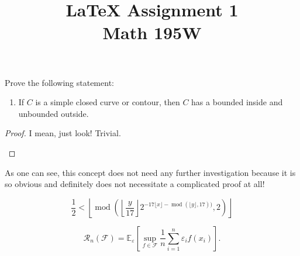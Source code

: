 \documentclass{eeleyes}
\author{\theauthor}
\title{\LaTeX \; Assignment 1 \\ \large Math 195W}
\begin{document}
\maketitle

\begin{theorem}
    Prove the following statement:
    \begin{enumerate}
        \item[]
        If $C$ is a simple closed curve or contour, then $C$ has a bounded inside and unbounded outside.
    \end{enumerate}
\end{theorem}

\begin{proof}
    I mean, just look! Trivial.
    \begin{figure}[h]
        \centering
    \end{figure}
\end{proof}

\noindent
As one can see, this concept does not need any further investigation because it is so obvious and definitely does not necessitate a complicated proof at all!

\begin{equation}
    \label{eq:tuppers}
    \frac{1}{2} < \left\lfloor \operatorname{mod}\left( \left\lfloor \frac{y}{17} \right\rfloor 2^{-17 \lfloor x \rfloor - \operatorname{mod}(\lfloor y \rfloor, 17))},2 \right) \right\rfloor
\end{equation}

\[
    \mathcal{R}_n(\mathcal{F})=\mathbb{E}_\varepsilon \left[ \sup_{f \in \mathcal{F}} \frac{1}{n} \sum_{i=1}^n \varepsilon_i f(x_i) \right] 
.\]
\end{document}
